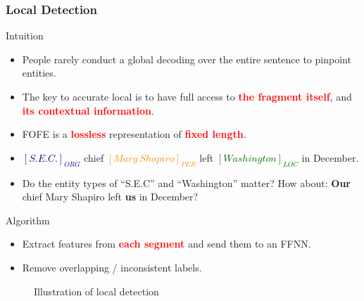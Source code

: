 \documentclass{beamer}
\begin{document}
\begin{frame}
\frametitle{Local Detection}
\begin{block}{Intuition}
	\begin{itemize}
	\item People rarely conduct a global decoding over the entire sentence to pinpoint entities.
	\item The key to accurate local is to have full access to
		\textbf{\textcolor{red}{the fragment itself}}, and
		\textbf{\textcolor{red}{its contextual information}}.
	\item FOFE is a \textbf{\textcolor{red}{lossless}} representation of \textbf{\textcolor{red}{fixed length}}.
	\end{itemize}
\end{block}
\begin{example}
    \begin{itemize}
    \item \textbf{\textcolor{navy}{$[S.E.C.]_{ORG}$}} chief 
            \textbf{\textcolor{darkorange}{$[Mary\ Shapiro]_{PER}$}} left 
            \textbf{\textcolor{darkgreen}{$[Washington]_{LOC}$}} in December. \\
    \item Do the entity types of ``S.E.C'' and ``Washington'' matter? How about:
    \textbf{Our} chief Mary Shapiro left \textbf{us} in December?
    \end{itemize}
\end{example}
\end{frame}
\begin{frame}
\begin{block}{Algorithm}
	\begin{itemize}
	\item Extract features from \textbf{\textcolor{red}{each segment}} and send them to an FFNN.
	\item Remove overlapping / inconsistent labels.
	\end{itemize}
\end{block}
\begin{figure}
	\centering
	\caption{\scriptsize Illustration of local detection}
\end{figure}
\end{frame}
\end{document}
